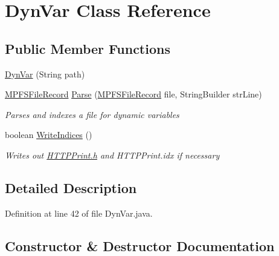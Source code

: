 \hypertarget{class_microchip_m_p_f_s_1_1_dyn_var}{}\section{Dyn\+Var Class Reference}
\label{class_microchip_m_p_f_s_1_1_dyn_var}
\subsection*{Public Member Functions}
\begin{DoxyCompactItemize}
\item 
\hyperlink{class_microchip_m_p_f_s_1_1_dyn_var_aecc868db75ec3265701a1c54565fcf77}{Dyn\+Var} (String path)
\item 
\hyperlink{class_microchip_m_p_f_s_1_1_m_p_f_s_file_record}{M\+P\+F\+S\+File\+Record} \hyperlink{class_microchip_m_p_f_s_1_1_dyn_var_a9a85ee108ffd5f122b64e4ef589115d7}{Parse} (\hyperlink{class_microchip_m_p_f_s_1_1_m_p_f_s_file_record}{M\+P\+F\+S\+File\+Record} file, String\+Builder str\+Line)
\begin{DoxyCompactList}\small\item\em Parses and indexes a file for dynamic variables \end{DoxyCompactList}\item 
boolean \hyperlink{class_microchip_m_p_f_s_1_1_dyn_var_a39a5d6c762a067bc7236981444ca6cd9}{Write\+Indices} ()
\begin{DoxyCompactList}\small\item\em Writes out \hyperlink{_h_t_t_p_print_8h}{H\+T\+T\+P\+Print.\+h} and H\+T\+T\+P\+Print.\+idx if necessary \end{DoxyCompactList}\end{DoxyCompactItemize}


\subsection{Detailed Description}


Definition at line 42 of file Dyn\+Var.\+java.



\subsection{Constructor \& Destructor Documentation}
\hypertarget{class_microchip_m_p_f_s_1_1_dyn_var_aecc868db75ec3265701a1c54565fcf77}{}
